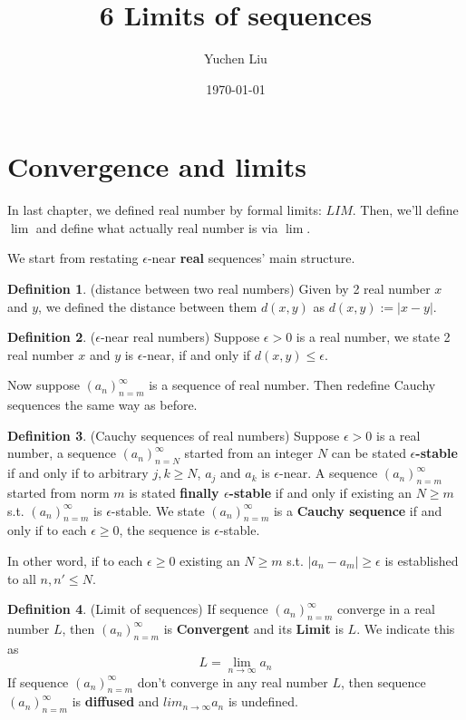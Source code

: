 \documentclass{article}
\title{6 Limits of sequences}
\author{Yuchen Liu}
\date{\today}
\begin{document}
\maketitle

\theoremstyle{definition}
\newtheorem{definition}{Definition}
\theoremstyle{theorem}
\newtheorem{theorem}{Theorem}

\section{Convergence and limits}
\par In last chapter, we defined real number by formal limits: $LIM$. Then, we'll define $\lim$ and define what actually real number is via $\lim$.
\par We start from restating $\epsilon$-near \textbf{real} sequences' main structure.
\begin{definition}
    (distance between two real numbers) Given by 2 real number $x$ and $y$, we defined the distance between them $d(x,y)$ as $d(x,y) := |x-y|$.
\end{definition}
\begin{definition}
    ($\epsilon$-near real numbers) Suppose $\epsilon > 0$ is a real number, we state 2 real number $x$ and $y$ is $\epsilon$-near, if and only if $d(x,y) \leqslant \epsilon$.
\end{definition}
\par Now suppose $(a_n)_{n=m}^{\infty}$ is a sequence of real number. Then redefine Cauchy sequences the same way as before.
\begin{definition}
    (Cauchy sequences of real numbers) Suppose $\epsilon > 0$ is a real number, a sequence $(a_n)_{n=N}^{\infty}$ started from an integer $N$ can be stated \textbf{$\epsilon$-stable} if and only if to arbitrary $j,k \geq N$, $a_j$ and $a_k$ is $\epsilon$-near. A sequence $(a_n)_{n=m}^{\infty}$ started from norm $m$ is stated \textbf{finally $\epsilon$-stable} if and only if existing an $N \geqslant m$ s.t. $(a_n)_{n=m}^{\infty}$ is $\epsilon$-stable. We state $(a_n)_{n=m}^{\infty}$ is a \textbf{Cauchy sequence} if and only if to each $\epsilon \ge 0$, the sequence is $\epsilon$-stable.
\end{definition}
\par In other word, if to each $\epsilon \ge 0$ existing an $N \geq m$ s.t. $|a_n - a_m| \geq \epsilon$ is established to all $n, n' \leq N$.
\begin{definition}
    (Limit of sequences) If sequence $(a_n)_{n=m}^{\infty}$ converge in a real number $L$, then $(a_n)_{n=m}^{\infty}$ is \textbf{Convergent} and its \textbf{Limit} is $L$. We indicate this as
    $$
    L = \lim_{n \rightarrow \infty}a_n
    $$
    If sequence $(a_n)_{n=m}^{\infty}$ don't converge in any real number $L$, then sequence $(a_n)_{n=m}^{\infty}$ is \textbf{diffused} and $lim_{n \rightarrow \infty}a_n$ is undefined.
\end{definition}
\end{document}
